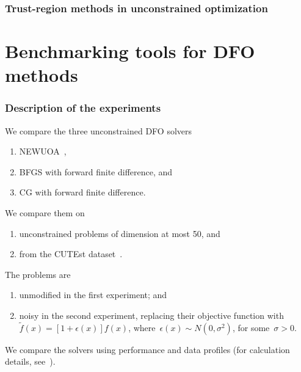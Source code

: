 \documentclass{polyu-presentation}
\newcommand{\obj}{f}
\begin{document}
\begin{frame}
    \frametitle{Trust-region methods in unconstrained optimization}
\end{frame}

\section{Benchmarking tools for DFO methods}

\begin{frame}
    \frametitle{Description of the experiments}

    We compare the three unconstrained DFO solvers
    \begin{enumerate}
        \item \alert{NEWUOA}~\parencite{Powell_2006,Powell_2008},
        \item \alert{BFGS} with forward finite difference, and
        \item \alert{CG} with forward finite difference.
    \end{enumerate}

    \medskip

    We compare them on
    \begin{enumerate}
        \item \alert{unconstrained problems} of dimension at most \num{50}, and
        \item from the \alert{CUTEst} dataset~\parencite{Gould_Orban_Toint_2015}.
    \end{enumerate}

    \medskip

    The problems are
    \begin{enumerate}
        \item \alert{unmodified} in the first experiment; and
        \item \alert{noisy} in the second experiment, replacing their objective function with~$\tilde{\obj}(x) = [1 + \epsilon(x)] \obj(x)$, where~$\epsilon(x) \sim N(0, \sigma^2)$, for some~$\sigma > 0$.
    \end{enumerate}

    \medskip

    We compare the solvers using \alert{performance and data profiles} (for calculation details, see~\cite{Dolan_More_2002,More_Wild_2009}).
\end{frame}
\end{document}
